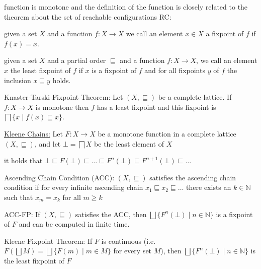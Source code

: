\documentclass[landscape, a4paper]{article}
\begin{document}
\begin{minipage}[t]{0.2\linewidth}
\begin{betterlist}
\begin{betterlist}
			\item function is monotone and the definition of the function is closely related to the theorem about the set of reachable configurations RC: 
		\end{betterlist}
		\item given a set $X$ and a function $f:X \rightarrow X$ we call an element $x \in X$ a \alert{fixpoint} of $f$ if $f(x) = x$. 
		\item given a set $X$ and a partial order $\sqsubseteq$ and a function $f:X \rightarrow X$, we call an element $x$ the \alert{least fixpoint} of $f$ if $x$ is a fixpoint of $f$ and for all fixpoints $y$ of $f$ the inclusion $x \sqsubseteq y$ holds. 
		\begin{betterlist}
			\item \color{orange}\alert{Knaster-Tarski Fixpoint Theorem}: Let $(X, \sqsubseteq)$ be a complete lattice. If $f:X \rightarrow X$ is monotone then $f$ has a least fixpoint and this fixpoint is $\bigsqcap \{x \mid f(x) \sqsubseteq x\}$. \color{black}
			\item {}
		\end{betterlist}
		\item \color{orange}\underline{Kleene Chains:} Let $F : X \rightarrow X$ be a monotone function in a complete lattice $(X, \sqsubseteq)$, and let $\bot = \bigsqcap X$ be the least element of $X$\color{black}
		\begin{betterlist}
			\item \color{orange}it holds that $\bot\sqsubseteq F(\bot) \sqsubseteq \ldots \sqsubseteq F^n(\bot) \sqsubseteq F^{n+1}(\bot) \sqsubseteq \ldots$\color{black}
			\item \color{orange}\alert{Ascending Chain Condition (ACC)}: $(X, \sqsubseteq)$ satisfies the \alert{ascending chain condition} if for every infinite ascending chain $x_1 \sqsubseteq x_2 \sqsubseteq \ldots$ there exists an $k \in \mathbb{N}$ such that $x_m = x_k$ for all $m \ge k$\color{black}
			\item \color{orange}\alert{ACC-FP}: If $(X, \sqsubseteq)$ satisfies the ACC, then $\bigsqcup\{F^n(\bot) \mid n \in  \mathbb{N}\}$ is a fixpoint of $F$ and can be computed in finite time. \color{black}
			\item \color{orange}\alert{Kleene Fixpoint Theorem}: If $F$ is continuous (i.e. $F(\bigsqcup M) = \bigsqcup \{F(m) \mid m \in M\}$ for every set $M$), then $\bigsqcup\{F^n(\bot) \mid n \in \mathbb{N}\}$ is the least fixpoint of $F$\color{black}		\end{betterlist}

\end{betterlist}
\end{minipage}
\end{document}
